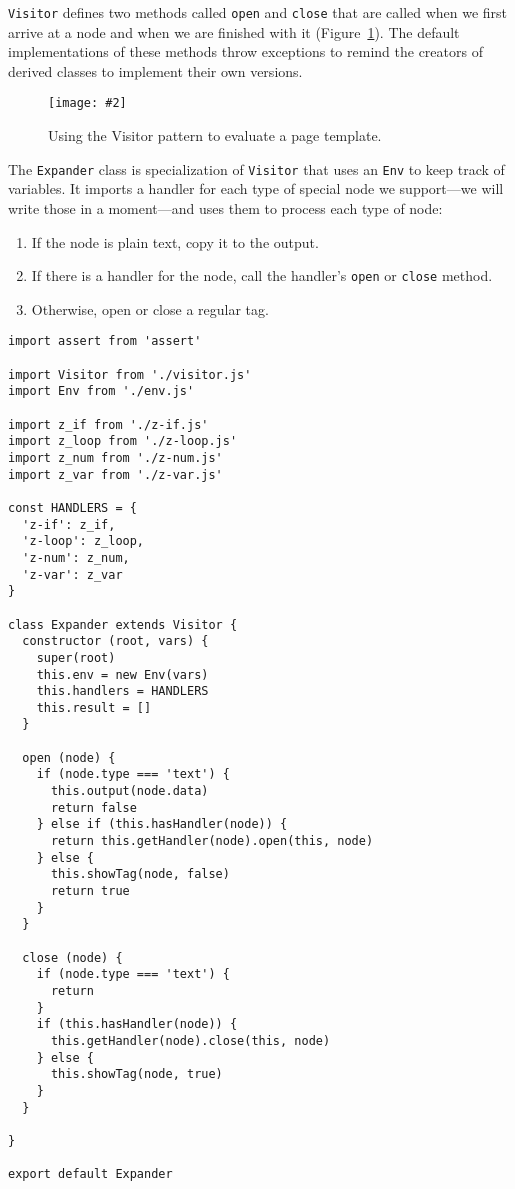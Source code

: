 \documentclass[krantzl]{krantz}
\newcommand{\figpdf}[4]{\begin{figure}%
\centering%
\texttt{[image: \#2]}%
\caption{#3}%
\label{#1}%
\end{figure}}
\newcommand{\figref}[1]{Figure~\ref{#1}}
\begin{document}
\noindent \texttt{Visitor} defines two methods called \texttt{open} and \texttt{close} that are called
when we first arrive at a node and when we are finished with it
(\figref{page-templates-visitor}).
The default implementations of these methods throw exceptions
to remind the creators of derived classes to implement their own versions.

\figpdf{page-templates-visitor}{./page-templates/visitor.pdf}{Using the Visitor pattern to evaluate a page template.}{0.6}


The \texttt{Expander} class is specialization of \texttt{Visitor}
that uses an \texttt{Env} to keep track of variables.
It imports a handler
for each type of special node we support---we will write those in a moment---and
uses them to process each type of node:

\begin{enumerate}

\item 

If the node is plain text, copy it to the output.



\item 

If there is a handler for the node,
    call the handler's \texttt{open} or \texttt{close} method.



\item 

Otherwise, open or close a regular tag.



\end{enumerate}


\begin{lstlisting}[frame=single,frameround=tttt]
import assert from 'assert'

import Visitor from './visitor.js'
import Env from './env.js'

import z_if from './z-if.js'
import z_loop from './z-loop.js'
import z_num from './z-num.js'
import z_var from './z-var.js'

const HANDLERS = {
  'z-if': z_if,
  'z-loop': z_loop,
  'z-num': z_num,
  'z-var': z_var
}

class Expander extends Visitor {
  constructor (root, vars) {
    super(root)
    this.env = new Env(vars)
    this.handlers = HANDLERS
    this.result = []
  }

  open (node) {
    if (node.type === 'text') {
      this.output(node.data)
      return false
    } else if (this.hasHandler(node)) {
      return this.getHandler(node).open(this, node)
    } else {
      this.showTag(node, false)
      return true
    }
  }

  close (node) {
    if (node.type === 'text') {
      return
    }
    if (this.hasHandler(node)) {
      this.getHandler(node).close(this, node)
    } else {
      this.showTag(node, true)
    }
  }

}

export default Expander
\end{lstlisting}
\end{document}
